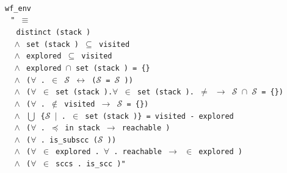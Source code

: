 \documentclass[a4 paper, 12pt]{article}
\newcommand{\where}{{\color{isa_green}{where}}}
\newcommand{\isa}[1]{\small\texttt{\\\noindent#1}}
\newcommand{\blue}[1]{{\color{isa_dark_blue}{#1}}}
\newcommand{\bblue}[1]{{\color{isa_blue}{#1}}}
\newcommand{\green}[1]{{\color{isa_dark_green}{#1}}}
\theoremstyle{definition}
\begin{document}
\isa{
    \bblue{definition} wf\_env \where{}\\
    $~~~$"\blue{wf\_env} \green{e} $\equiv$\\
    $~~~~~~$distinct (stack \green{e})\\
    $~~~~\wedge$ set (stack \green{e}) $\subseteq$ visited \green{e}\\
    $~~~~\wedge$ explored \green{e} $\subseteq$ visited \green{e}\\
    $~~~~\wedge$ explored \green{e} $\cap$ set (stack \green{e}) = \{\}\\
    $~~~~\wedge$ ($\forall$ \green{v} \green{w}. \green{w} $\in$ $\mathcal{S}$ \green{e} \green{v} $\longleftrightarrow$ ($\mathcal{S}$ \green{e} \green{v} = $\mathcal{S}$ \green{e} \green{w}))\\
    $~~~~\wedge$ ($\forall$\green{v} $\in$ set (stack \green{e}).$\forall$ \green{w} $\in$ set (stack \green{e}).\green{v} $\neq$ \green{w} $\longrightarrow$ $\mathcal{S}$ \green{e} \green{v} $\cap$ $\mathcal{S}$ \green{e} \green{w} = \{\})\\
    $~~~~\wedge$ ($\forall$ \green{v}. \green{v} $\notin$ visited \green{e} $\longrightarrow$ $\mathcal{S}$ \green{e} \green{v} = \{\green{v}\})\\
    $~~~~\wedge$ $\bigcup$ \{$\mathcal{S}$ \green{e} \green{v} $|$ \green{v}. \green{v} $\in$ set (stack \green{e})\} = visited \green{e} - explored \green{e}\\
    $~~~~\wedge$ ($\forall$ \green{x} \green{y}. \green{x} $\preceq$ \green{y} in stack \green{e} $\longrightarrow$ reachable \green{y} \green{x})\\
    $~~~~\wedge$ ($\forall$ \green{x}. is\_subscc ($\mathcal{S}$ \green{e} \green{x}))\\
    $~~~~\wedge$ ($\forall$ \green{x} $\in$ explored \green{e}. $\forall$ \green{y}. reachable \green{x} \green{y} $\longrightarrow$ \green{y} $\in$ explored \green{e})\\
    $~~~~\wedge$ ($\forall$ \green{S} $\in$ sccs \green{e}. is\_scc \green{S})"
}

\BlankLine
\BlankLine
\end{document}
